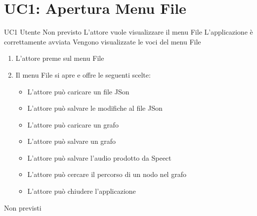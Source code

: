 \documentclass[../AnalisideiRequisiti.tex]{subfiles}
\begin{document}
	\section{UC1: Apertura Menu File}
	\UserCase
	{UC1}
	{Utente}
	{Non previsto}
	{L'attore vuole visualizzare il menu File}
	{L'applicazione è correttamente avviata }
	{Vengono visualizzate le voci del menu File}
	{	\begin{enumerate}
			\item{} L'attore preme sul menu File
			\item{} Il menu File si apre e offre le seguenti scelte:
		\begin{itemize}
		\item{} L'attore può caricare un file JSon 
		\item{} L'attore può salvare le modifiche al file JSon 
		\item{} L'attore può caricare un grafo 
		\item{} L'attore può salvare un grafo 
		\item{} L'attore può salvare l'audio prodotto da Speect 
		\item{} L'attore può cercare il percorso di un nodo nel grafo 
		\item{} L'attore può chiudere l'applicazione 
		\end{itemize}
	\end{enumerate}
	}
	{Non previsti}
\end{document}
